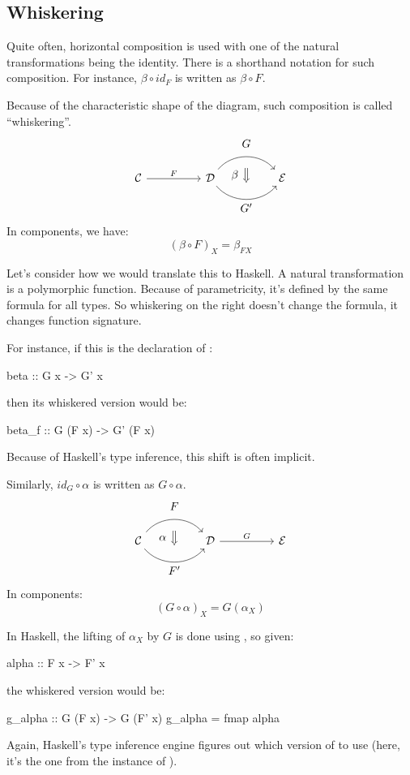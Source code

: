 \documentclass[DaoFP]{subfiles}
\begin{document}
\subsection{Whiskering}

Quite often, horizontal composition is used with one of the natural transformations being the identity. There is a shorthand notation for such composition. For instance, $\beta \circ id_F$ is written as $\beta \circ F$. 

Because of the characteristic shape of the diagram, such composition is called ``whiskering''.
\[
\begin{tikzcd}[column sep=huge]
\mathcal{C}
 \arrow[r, "F"]
 &
\mathcal{D}
  \arrow[bend left=50]{r}[name=U1, label=above:$G$]{}
  \arrow[bend right=50]{r}[name=D1, label=below:$G'$]{} 
 &
\mathcal{E}
  \arrow[shorten <=10pt,shorten >=10pt,Rightarrow,to path={(U1) -- node[label=left:$\beta$] {} (D1)}]{}
\end{tikzcd}
\]
In components, we have:
\[ (\beta \circ F)_X = \beta_{F X} \]

Let's consider how we would translate this to Haskell. A natural transformation is a polymorphic function. Because of parametricity, it's defined by the same formula for all types. So whiskering on the right doesn't change the formula, it changes function signature. 

For instance, if this is the declaration of :
\begin{haskell}
beta :: G x -> G' x
\end{haskell}
then its whiskered version would be:
\begin{haskell}
beta_f :: G (F x) -> G' (F x)
\end{haskell}
Because of Haskell's type inference, this shift is often implicit.

Similarly, $id_G \circ \alpha$ is written as $G \circ \alpha$.
\[
\begin{tikzcd}[column sep=huge]
\mathcal{C}
  \arrow[bend left=50]{r}[name=U, label=above:$F$]{}
  \arrow[bend right=50]{r}[name=D, label=below:$F'$]{} 
 &
\mathcal{D}
\arrow[r, "G"]
&
\mathcal{E}
  \arrow[shorten <=10pt,shorten >=10pt,Rightarrow,to path={(U) -- node[label=left:$\alpha$] {} (D)}]{}
\end{tikzcd}
\]
In components:
\[(G \circ \alpha)_X = G (\alpha_X) \]

In Haskell, the lifting of $\alpha_X$ by $G$ is done using , so given:
\begin{haskell}
alpha :: F x -> F' x
\end{haskell}
the whiskered version would be:
\begin{haskell}
g_alpha :: G (F x) -> G (F' x)
g_alpha = fmap alpha
\end{haskell}
Again, Haskell's type inference engine figures out which version of  to use (here, it's the one from the  instance of ).
\end{document}
